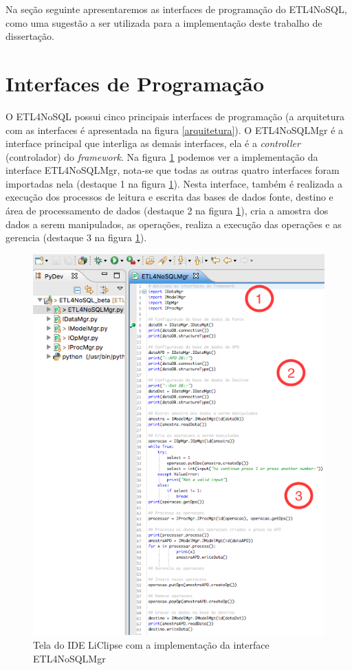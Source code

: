 Na seção seguinte apresentaremos as interfaces de programação do ETL4NoSQL, como uma sugestão a ser utilizada para a implementação deste trabalho de dissertação.


\section{Interfaces de Programação}

O ETL4NoSQL possui cinco principais interfaces de programação (a arquitetura com as interfaces é apresentada na figura \ref{arquitetura}). O ETL4NoSQLMgr é a interface principal que interliga as demais interfaces, ela é a \textit{controller} (controlador) do \textit{framework}. Na figura \ref{etl4nosqlmgr} podemos ver a implementação da interface ETL4NoSQLMgr, nota-se que todas as outras quatro interfaces foram importadas nela (destaque 1 na figura \ref{etl4nosqlmgr}). Nesta interface, também é realizada a execução dos processos de leitura e escrita das bases de dados fonte, destino e área de processamento de dados (destaque 2 na figura \ref{etl4nosqlmgr}), cria a amostra dos dados a serem manipulados, as operações, realiza a execução das operações e as gerencia (destaque 3 na figura \ref{etl4nosqlmgr}).

\begin{figure}[h!]
	\centering
	\includegraphics[scale=0.8]{fig/etl4nosqlmgr.png}
	\caption{Tela do IDE LiClipse com a implementação da interface ETL4NoSQLMgr}
	\label{etl4nosqlmgr}
\end{figure}


